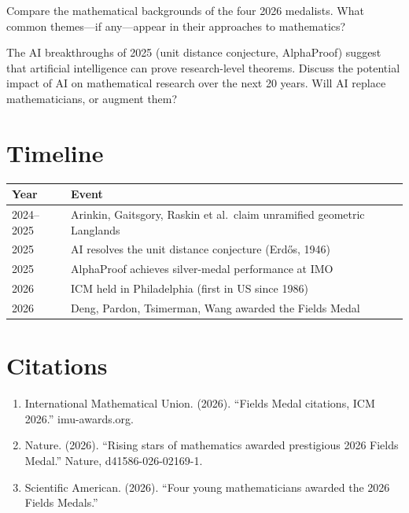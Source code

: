 \begin{exercise}[Intermediate]
Compare the mathematical backgrounds of the four 2026 medalists. What common themes---if any---appear in their approaches to mathematics?
\end{exercise}

\begin{exercise}[Challenge]
The AI breakthroughs of 2025 (unit distance conjecture, AlphaProof) suggest that artificial intelligence can prove research-level theorems. Discuss the potential impact of AI on mathematical research over the next 20 years. Will AI replace mathematicians, or augment them?
\end{exercise}

\section{Timeline}

\begin{tabularx}{\linewidth}{lX}
\toprule
\textbf{Year} & \textbf{Event} \\ \midrule
2024--2025 & Arinkin, Gaitsgory, Raskin et al.\ claim unramified geometric Langlands \\
2025 & AI resolves the unit distance conjecture (Erd\H{o}s, 1946) \\
2025 & AlphaProof achieves silver-medal performance at IMO \\
2026 & ICM held in Philadelphia (first in US since 1986) \\
2026 & Deng, Pardon, Tsimerman, Wang awarded the Fields Medal \\
\bottomrule
\end{tabularx}

\section{Citations}

\begin{enumerate}
\item International Mathematical Union. (2026). ``Fields Medal citations, ICM 2026.'' imu-awards.org.
\item Nature. (2026). ``Rising stars of mathematics awarded prestigious 2026 Fields Medal.'' Nature, d41586-026-02169-1.
\item Scientific American. (2026). ``Four young mathematicians awarded the 2026 Fields Medals.''
\end{enumerate}
